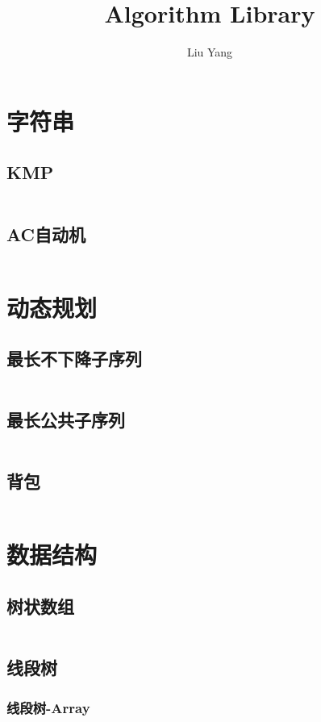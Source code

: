 \documentclass[a4paper,11pt]{article}
\author{Liu Yang}
\title{Algorithm Library}
\begin{document}
 
\maketitle %
\newpage %
\tableofcontents %
\newpage
\section{字符串}
\subsection{KMP}
\inputminted[breaklines]{c++}{字符串/KMP.cpp}
\subsection{AC自动机}
\inputminted[breaklines]{c++}{字符串/AC自动机.cpp}


\section{动态规划}
\subsection{最长不下降子序列}
\inputminted[breaklines]{c++}{动态规划/最长不下降子序列_LIS.cpp}
\subsection{最长公共子序列}
\inputminted[breaklines]{c++}{动态规划/最长公共子序列_LCS.cpp}
\subsection{背包}
\inputminted[breaklines]{c++}{动态规划/背包.cpp}


\section{数据结构}
\subsection{树状数组}
\inputminted[breaklines]{c++}{数据结构/树状数组.cpp}
\subsection{线段树}
\subsubsection{线段树-Array}
\inputminted[breaklines]{c++}{数据结构/线段树.cpp}
\end{document}
